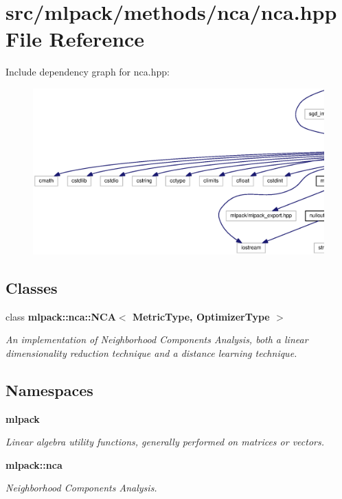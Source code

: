 \section{src/mlpack/methods/nca/nca.hpp File Reference}
\label{nca_8hpp}
Include dependency graph for nca.\+hpp\+:
\nopagebreak
\begin{figure}[H]
\begin{center}
\leavevmode
\includegraphics[width=350pt]{nca_8hpp__incl}
\end{center}
\end{figure}
\subsection*{Classes}
\begin{DoxyCompactItemize}
\item 
class {\bf mlpack\+::nca\+::\+N\+C\+A$<$ Metric\+Type, Optimizer\+Type $>$}
\begin{DoxyCompactList}\small\item\em An implementation of Neighborhood Components Analysis, both a linear dimensionality reduction technique and a distance learning technique. \end{DoxyCompactList}\end{DoxyCompactItemize}
\subsection*{Namespaces}
\begin{DoxyCompactItemize}
\item 
 {\bf mlpack}
\begin{DoxyCompactList}\small\item\em Linear algebra utility functions, generally performed on matrices or vectors. \end{DoxyCompactList}\item 
 {\bf mlpack\+::nca}
\begin{DoxyCompactList}\small\item\em Neighborhood Components Analysis. \end{DoxyCompactList}\end{DoxyCompactItemize}


